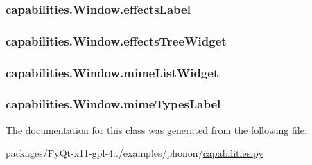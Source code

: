 \subsubsection[{effects\+Label}]{\setlength{\rightskip}{0pt plus 5cm}capabilities.\+Window.\+effects\+Label}\label{classcapabilities_1_1Window_a331fb06a3a71d8dcafa327be69a1c059}
\hypertarget{classcapabilities_1_1Window_a6f3a09001053cece6f9bef9c161d54f0}{}
\subsubsection[{effects\+Tree\+Widget}]{\setlength{\rightskip}{0pt plus 5cm}capabilities.\+Window.\+effects\+Tree\+Widget}\label{classcapabilities_1_1Window_a6f3a09001053cece6f9bef9c161d54f0}
\hypertarget{classcapabilities_1_1Window_ac37ef4ac9c401055179ec8f51f20f2b3}{}
\subsubsection[{mime\+List\+Widget}]{\setlength{\rightskip}{0pt plus 5cm}capabilities.\+Window.\+mime\+List\+Widget}\label{classcapabilities_1_1Window_ac37ef4ac9c401055179ec8f51f20f2b3}
\hypertarget{classcapabilities_1_1Window_af3e76a03dda9054fc9e7a095f5def94d}{}
\subsubsection[{mime\+Types\+Label}]{\setlength{\rightskip}{0pt plus 5cm}capabilities.\+Window.\+mime\+Types\+Label}\label{classcapabilities_1_1Window_af3e76a03dda9054fc9e7a095f5def94d}


The documentation for this class was generated from the following file\+:\begin{DoxyCompactItemize}
\item 
packages/\+Py\+Qt-\/x11-\/gpl-\/4../examples/phonon/\hyperlink{capabilities_8py}{capabilities.\+py}\end{DoxyCompactItemize}
